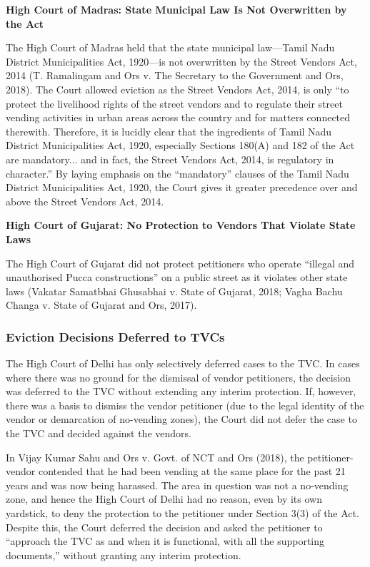 \documentclass[a4paper, 12pt, twoside]{article}
\begin{document}
{\textbf{High Court of Madras: State Municipal Law Is Not Overwritten by the Act}

The High Court of Madras held that the state municipal law—Tamil Nadu District Municipalities Act, 1920—is not overwritten by the Street Vendors Act, 2014 (T. Ramalingam and Ors v. The Secretary to the Government and Ors, 2018). The Court allowed eviction as the Street Vendors Act, 2014, is only “to protect the livelihood rights of the street vendors and to regulate their street vending activities in urban areas across the country and for matters connected therewith. Therefore, it is lucidly clear that the ingredients of Tamil Nadu District Municipalities Act, 1920, especially Sections 180(A) and 182 of the Act  are mandatory... and in fact, the Street Vendors Act, 2014, is regulatory in character.” By laying emphasis on the “mandatory” clauses of the Tamil Nadu District Municipalities Act, 1920, the Court gives it greater precedence over and above the Street Vendors Act, 2014.

\textbf{High Court of Gujarat: No Protection to Vendors That Violate State Laws}

The High Court of Gujarat did not protect petitioners who operate “illegal and unauthorised Pucca constructions” on a public street as it violates other state laws (Vakatar Samatbhai Ghusabhai v. State of Gujarat, 2018; Vagha Bachu Changa v. State of Gujarat and Ors, 2017).

\subsubsection*{Eviction Decisions Deferred to TVCs}

The High Court of Delhi has only selectively deferred cases to the TVC. In cases where there was no ground for the dismissal of vendor petitioners, the decision was deferred to the TVC without extending any interim protection. If, however, there was a basis to dismiss the vendor petitioner (due to the legal identity of the vendor or demarcation of no-vending zones), the Court did not defer the case to the TVC and decided against the vendors.

In Vijay Kumar Sahu and Ors v. Govt. of NCT and Ors (2018), the petitioner-vendor contended that he had been vending at the same place for the past 21 years and was now being harassed. The area in question was not a no-vending zone, and hence the High Court of Delhi had no reason, even by its own yardstick, to deny the protection to the petitioner under Section 3(3) of the Act. Despite this, the Court deferred the decision and asked the petitioner to “approach the TVC as and when it is functional, with all the supporting documents,” without granting any interim protection.

}
\end{document}
